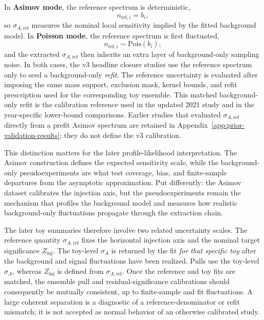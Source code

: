 In \textbf{Asimov mode}, the reference spectrum is deterministic,
\begin{equation}
n_{\mathrm{ref},i} = b_i,
\end{equation}
so $\sigma_{A,\mathrm{ref}}$ measures the nominal local sensitivity implied by the
fitted background model. In \textbf{Poisson mode}, the reference spectrum is first
fluctuated,
\begin{equation}
n_{\mathrm{ref},i} \sim \mathrm{Pois}\!\left(b_i\right),
\end{equation}
and the extracted $\sigma_{A,\mathrm{ref}}$ then inherits an extra layer of
background-only sampling noise. In both cases, the v3 headline closure studies use the
reference spectrum only to seed a background-only \emph{refit}. The reference
uncertainty is evaluated after imposing the same mass support, exclusion mask, kernel
bounds, and refit prescription used for the corresponding toy ensemble. This matched
background-only refit is the calibration reference used in the updated 2021 study and
in the year-specific lower-bound comparisons. Earlier studies that evaluated
$\sigma_{A,\mathrm{ref}}$ directly from a prefit Asimov spectrum are retained in
Appendix~\ref{app:prior-validation-results}; they do not define the v3 calibration.

This distinction matters for the later profile-likelihood interpretation. The Asimov
construction defines the expected sensitivity scale, while the background-only
pseudoexperiments are what test coverage, bias, and finite-sample departures from the
asymptotic approximation. Put differently: the Asimov dataset calibrates the injection
axis, but the pseudoexperiments remain the mechanism that profiles the background model
and measures how realistic background-only fluctuations propagate through the
extraction chain.

The later toy summaries therefore involve two related uncertainty scales. The reference
quantity $\sigma_{A,\mathrm{ref}}$ fixes the horizontal injection axis and the nominal
target significance $Z_{\mathrm{inj}}$. The toy-level $\sigma_A$ is returned by the fit
\emph{for that specific toy} after the background and signal fluctuations have been
realized. Pulls use the toy-level $\sigma_A$, whereas $Z_{\mathrm{inj}}$ is defined from
$\sigma_{A,\mathrm{ref}}$. Once the reference and toy fits are matched, the ensemble
pull and residual-significance calibrations should consequently be mutually
consistent, up to finite-sample and fit fluctuations. A large coherent separation is
a diagnostic of a reference-denominator or refit mismatch; it is not accepted as
normal behavior of an otherwise calibrated study.


